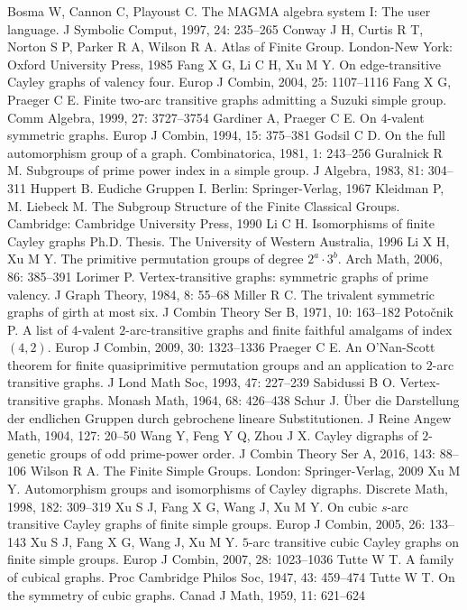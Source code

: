 \documentclass[12pt]{article}
\begin{document}
\begin{thebibliography}{99}
Bosma W, Cannon C, Playoust C. The MAGMA algebra system I: The user language.
J Symbolic Comput, 1997, 24: 235--265%
Conway J H, Curtis R T, Norton S P, Parker R A, Wilson R A. Atlas of Finite Group.
London-New York: Oxford University Press,  1985
Fang X G, Li C H, Xu M Y. On edge-transitive Cayley graphs of valency four.
Europ J Combin, 2004, 25: 1107--1116%
Fang X G, Praeger C E. Finite two-arc transitive graphs admitting a Suzuki simple group.
Comm Algebra, 1999, 27: 3727--3754%
Gardiner A, Praeger C E. On 4-valent symmetric graphs.
Europ J Combin, 1994, 15: 375--381%
Godsil C D. On the full automorphism group of a graph.
Combinatorica, 1981, 1: 243--256%
Guralnick R M. Subgroups of prime power index in a simple group.
J Algebra, 1983, 81: 304--311%
Huppert B. Eudiche Gruppen I. Berlin: Springer-Verlag, 1967
Kleidman P, M. Liebeck M. The Subgroup Structure of the Finite Classical Groups.
 Cambridge: Cambridge University Press, 1990
Li C H. Isomorphisms of finite Cayley graphs Ph.D. Thesis. The University of Western Australia, 1996
Li X H, Xu M Y. The primitive permutation groups of degree $2^a\cdot3^b$.
Arch Math, 2006, 86: 385--391%
Lorimer P. Vertex-transitive graphs: symmetric graphs of prime valency.
J Graph Theory, 1984, 8: 55--68%
Miller R C. The trivalent symmetric graphs of girth at most six.
J Combin Theory Ser B, 1971, 10: 163--182%
Poto\v cnik P. A list of $4$-valent $2$-arc-transitive graphs and finite faithful
amalgams of index $(4,2)$. Europ J Combin, 2009, 30: 1323--1336%
Praeger C E. An O'Nan-Scott theorem for finite quasiprimitive permutation groups and an
application to $2$-arc transitive graphs.
J Lond Math Soc, 1993, 47: 227--239%
Sabidussi B O. Vertex-transitive graphs. Monash Math, 1964, 68: 426--438%
Schur J. \" Uber die Darstellung der endlichen Gruppen durch gebrochene lineare Substitutionen. J Reine Angew Math, 1904, 127: 20--50%
Wang Y, Feng Y Q, Zhou J X. Cayley digraphs of  $2$-genetic groups of odd prime-power order. J Combin Theory Ser A, 2016, 143: 88--106%
Wilson R A. The Finite Simple Groups. London: Springer-Verlag, 2009
Xu M Y. Automorphism groups and isomorphisms of Cayley digraphs.
Discrete Math, 1998, 182: 309--319%
Xu S J, Fang X G, Wang J, Xu M Y. On cubic $s$-arc transitive Cayley graphs of finite simple groups.
Europ J Combin, 2005, 26: 133--143%
Xu S J, Fang X G, Wang J, Xu M Y. $5$-arc transitive cubic Cayley graphs on finite simple groups.
Europ J Combin, 2007, 28: 1023--1036%
Tutte W T. A family of cubical graphs. Proc Cambridge Philos Soc, 1947, 43: 459--474%
Tutte W T. On the symmetry of cubic graphs. Canad J Math, 1959, 11: 621--624%
\end{thebibliography}
\end{document}
